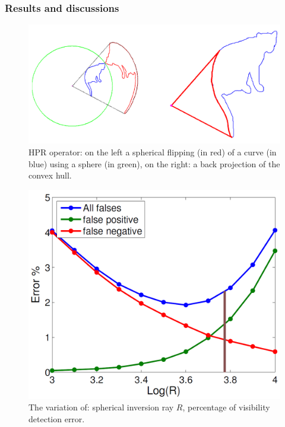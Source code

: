 \subsubsection{Results and discussions}
\begin{figure}
  \centering
  \includegraphics[scale=0.2]{img/hpr.png}
  \caption{HPR operator: on the left a spherical flipping (in red) of a curve (in blue) using a sphere (in green), on the right: a back projection of the convex hull.}
  \label{fig:hpr}
\end{figure}
\begin{figure}
  \centering
  \includegraphics[scale=0.35]{img/hpr-r.png}
  \caption{The variation of: spherical inversion ray $R$, percentage of visibility detection error.}
  \label{fig:hpr-r}
\end{figure}

